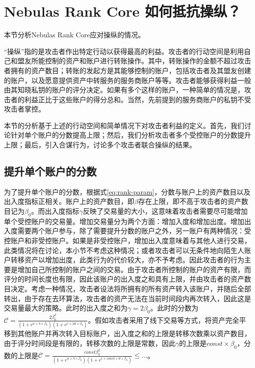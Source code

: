 
\section{Nebulas Rank Core 如何抵抗操纵？}
本节分析Nebulas Rank Core应对操纵的情况。

“操纵”指的是攻击者作出特定行动以获得最高的利益。攻击者的行动空间是利用自己和盟友所能控制的资产和账户进行转账操作。其中，转账操作的金额不超过攻击者拥有的资产数目；转账的发起方是其能够控制的账户，包括攻击者及其盟友创建的账户，以及愿意提供资产中转服务的服务商账户等等。攻击者能够获得利益一般由其知晓私钥的账户的评分决定。如果有多个这样的账户，一种简单的情况是，攻击者的利益正比于这些账户的得分总和。当然，先前提到的服务商账户的私钥不受攻击者掌控。

本节的分析基于上述的行动空间和简单情况下对攻击者利益的定义。首先，我们讨论针对单个账户的分数提高上限；然后，我们分析攻击者多个受控账户的分数提升上限；最后，引入合谋行为，讨论多个攻击者联合操纵的结果。


\subsection{提升单个账户的分数 \label{sec:cheat-single}}
为了提升单个账户的分数，根据式\ref{eq:rank-param}，分数与账户上的资产数目以及出入度指标正相关。账户上的资产数目，即$\beta$存在上限，即不高于攻击者的资产数目记为$\beta_0$。而出入度指标$\gamma$反映了交易量的大小，这意味着攻击者需要尽可能增加单个受控账户的交易量。增加交易量分为两个方面：增加入度和增加出度。增加出入度需要两个账户参与，除了需要提升分数的账户之外，另一账户有两种情况：受控账户和非受控账户。如果是非受控账户，增加出入度意味着与其他人进行交易，此类情况将在讨论，本小节不考虑这种情况；或者攻击者可以无条件地向陌生人账户转移资产以增加出度，此类行为的代价较大，亦不予考虑。因此攻击者的行为主要是增加自己所控制的账户之间的交易。由于攻击者所控制的账户的资产有限，而评分的时间长度也有限，因此该账户的出入度之和具有上限，并由攻击者的资产数目决定。考虑一种情况，攻击者设法将所拥有的所有资产转入该账户，并随后全部转出，由于存在去环算法，攻击者的资产无法在当前时间段内再次转入，因此这是交易量最大的策略。此时的出入度之和为$\gamma = 2 \beta_0$。此时的分数为$\mathcal{C} =  \frac{2 \beta_0 ^2}{ (1+e^{a + b \times{} \beta_0}) (1+e^{c + 2 d \times{} \beta_0})}$。假如攻击者采用了线下交易等方式，将资产完全平移到其他账户并再次转入目标账户，出入度之和的上限是转移次数乘以资产数目，由于评分时间段是有限的，转移次数的上限是常数，因此$\gamma$的上限是$const \times \beta_0$，分数的上限是$\mathcal{C} =  \frac{const \beta_0 ^2}{ (1+e^{a + b \times{} \beta_0}) (1+e^{c + const \times d \times{} \beta_0})} \leq ...$。

